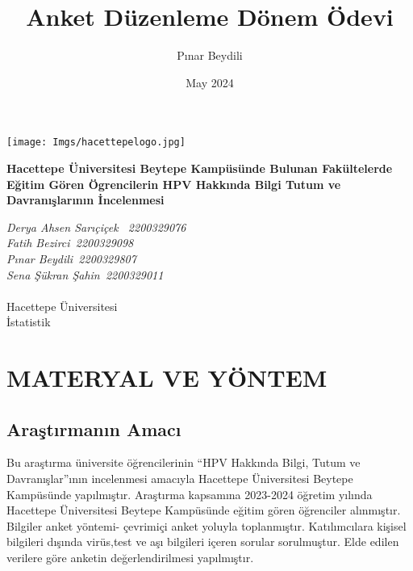 \documentclass[turkish]{article}
\title{Anket Düzenleme Dönem Ödevi}
\author{Pınar Beydili}
\date{May 2024}
\begin{document}
\begin{titlepage}
    \begin{center}
 \begin{center}
            
            \centering
            \texttt{[image: Imgs/hacettepelogo.jpg]}
            \caption{}
            \label{}
        \end{center}   
        
        \vspace*{1cm}
        \Huge
        \textbf{Hacettepe Üniversitesi Beytepe Kampüsünde Bulunan Fakültelerde Eğitim Gören Ögrencilerin HPV Hakkında
Bilgi Tutum ve Davranışlarının İncelenmesi }
 
        \vfill
   
        \Large
        \textit{Derya Ahsen Sarıçiçek ~2200329076 \\
        Fatih Bezirci~2200329098 \\
        Pınar Beydili~2200329807\\
        Sena Şükran Şahin~2200329011 \\
        }\\
        
        \vfill
        Hacettepe Üniversitesi \\
        İstatistik \\
        
    \end{center}
\end{titlepage}

\newpage

\tableofcontents
\clearpage

\section{MATERYAL VE YÖNTEM}

\subsection{Araştırmanın Amacı}
Bu araştırma üniversite öğrencilerinin “HPV Hakkında Bilgi, Tutum ve Davranışlar”ının incelenmesi amacıyla Hacettepe Üniversitesi Beytepe Kampüsünde yapılmıştır. 
Araştırma kapsamına 2023-2024 öğretim yılında Hacettepe Üniversitesi Beytepe Kampüsünde eğitim gören öğrenciler alınmıştır. Bilgiler anket yöntemi- çevrimiçi anket yoluyla toplanmıştır. Katılımcılara kişisel bilgileri dışında virüs,test ve aşı bilgileri içeren  sorular sorulmuştur. Elde edilen verilere göre anketin değerlendirilmesi yapılmıştır. 
\end{document}
